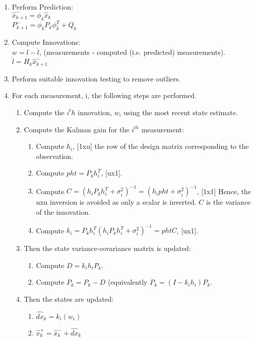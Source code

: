 \documentclass[letterpaper,11pt]{article}
\begin{document}
\begin{enumerate}
  \item Perform Prediction: \\
         $ \hat{x}_{k+1}^- = \phi_k \hat{x}_{k} $ \\
         $ P_{k+1}^- = \phi_k P_k \phi_k^T + Q_k $
  \item Compute Innovations: \\
         $ w = l-\hat{l} $, (measurements - computed (i.e. predicted) measurements). \\
         $ \hat{l} = H_k \hat{x}_{k+1}^- $
  \item Perform suitable innovation testing to remove outliers.
  \item For each measurement, i, the following steps are performed.
  \begin{enumerate}
    \item Compute the $i^th$ innovation, $w_i$ using the most recent state estimate.
    \item Compute the Kalman gain for the $i^{th}$ measurement:
    \begin{enumerate}
      \item Compute $h_i$, [1xu] the row of the design matrix corresponding to the observation.
      \item Compute $pht = P_k h_i^T$, [ux1].
      \item Compute $C = (h_i P_k h_i^T + \sigma_i^2)^{-1} = (h_i pht + \sigma_i^2)^{-1}$, [1x1]  Hence, the uxu inversion is avoided as only a scalar is inverted. $C$ is the variance of the innovation.
      \item Compute $k_i = P_k h_i^T ( h_i P_k h_i^T + \sigma_i^2)^{-1} = pht C$, [ux1].
    \end{enumerate}
    \item Then the state variance-covariance matrix is updated:
    \begin{enumerate}
      \item Compute $D = k_i h_i P_k$.
      \item Compute $P_k = P_k - D$ (equivalently $P_k = (I-k_i h_i)P_k$.
    \end{enumerate}
    \item Then the states are updated:
    \begin{enumerate}
      \item $ \widehat{dx}_k = k_i(w_i) $
      \item $ \hat{x}_k^+ = \hat{x}_k^- + \widehat{dx}_k $
    \end{enumerate}
  \end{enumerate}
\end{enumerate}
\end{document}
